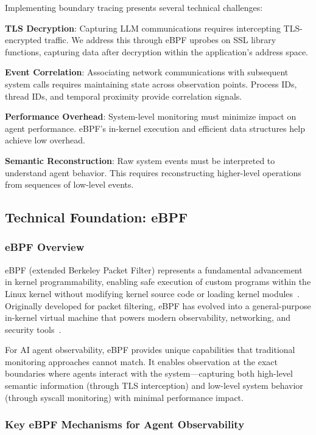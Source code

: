 \documentclass[sigplan,screen，review,9pt]{acmart}
\begin{document}
Implementing boundary tracing presents several technical challenges:

\textbf{TLS Decryption}: Capturing LLM communications requires intercepting TLS-encrypted traffic. We address this through eBPF uprobes on SSL library functions, capturing data after decryption within the application's address space.

\textbf{Event Correlation}: Associating network communications with subsequent system calls requires maintaining state across observation points. Process IDs, thread IDs, and temporal proximity provide correlation signals.

\textbf{Performance Overhead}: System-level monitoring must minimize impact on agent performance. eBPF's in-kernel execution and efficient data structures help achieve low overhead.

\textbf{Semantic Reconstruction}: Raw system events must be interpreted to understand agent behavior. This requires reconstructing higher-level operations from sequences of low-level events.

\subsection{Technical Foundation: eBPF}

\subsubsection{eBPF Overview}

eBPF (extended Berkeley Packet Filter) represents a fundamental advancement in kernel programmability, enabling safe execution of custom programs within the Linux kernel without modifying kernel source code or loading kernel modules~\cite{brendangregg}. Originally developed for packet filtering, eBPF has evolved into a general-purpose in-kernel virtual machine that powers modern observability, networking, and security tools~\cite{ebpfio}.

For AI agent observability, eBPF provides unique capabilities that traditional monitoring approaches cannot match. It enables observation at the exact boundaries where agents interact with the system—capturing both high-level semantic information (through TLS interception) and low-level system behavior (through syscall monitoring) with minimal performance impact.

\subsubsection{Key eBPF Mechanisms for Agent Observability}
\end{document}
